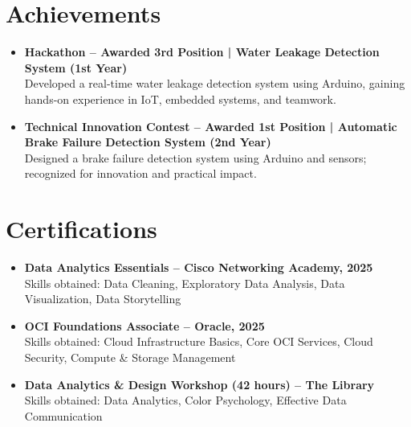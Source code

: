 \documentclass[a4paper,12pt]{article}
\begin{document}
\section{Achievements}
\begin{itemize}[leftmargin=1.5em,itemsep=0.9em]
  \item \textbf{Hackathon – Awarded 3rd Position | Water Leakage Detection System (1st Year)}\\
  Developed a real-time water leakage detection system using Arduino, gaining hands-on experience in IoT, embedded systems, and teamwork.

  \item \textbf{Technical Innovation Contest – Awarded 1st Position | Automatic Brake Failure Detection System (2nd Year)}\\
  Designed a brake failure detection system using Arduino and sensors; recognized for innovation and practical impact.
\end{itemize}

\section{Certifications}
\begin{itemize}[leftmargin=1.5em,itemsep=0.9em]
    \item \textbf{Data Analytics Essentials – Cisco Networking Academy, 2025} \\
    Skills obtained: Data Cleaning, Exploratory Data Analysis, Data Visualization, Data Storytelling

    \item \textbf{OCI Foundations Associate – Oracle, 2025} \\
    Skills obtained: Cloud Infrastructure Basics, Core OCI Services, Cloud Security, Compute \& Storage Management

    \item \textbf{Data Analytics \& Design Workshop (42 hours) – The Library} \\
    Skills obtained: Data Analytics, Color Psychology, Effective Data Communication
\end{itemize}

\vfill
{}
\end{document}
